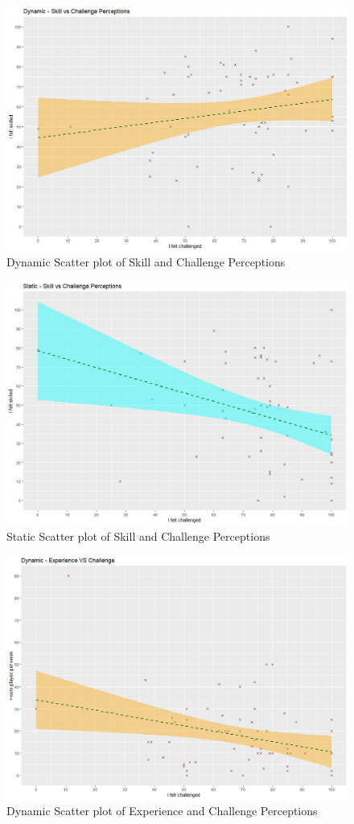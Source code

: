 \documentclass[journal]{IEEEtran}
\begin{document}
\begin{figure}[h]
	\includegraphics[width=0.75\linewidth]{dynamicchallengevsskilled.jpg}
	\caption{Dynamic Scatter plot of Skill and Challenge Perceptions}
	\label{fig::15}
\end{figure} 

\begin{figure}[h]
	\includegraphics[width=0.75\linewidth]{staticchallengevsskilled.jpg}
	\caption{Static Scatter plot of Skill and Challenge Perceptions}
	\label{fig::16}
\end{figure} 

\begin{figure}[h]
	\includegraphics[width=0.75\linewidth]{dynamicexpvschallenge.jpg}
	\caption{Dynamic Scatter plot of Experience and Challenge Perceptions}
	\label{fig::17}
\end{figure}
\end{document}
